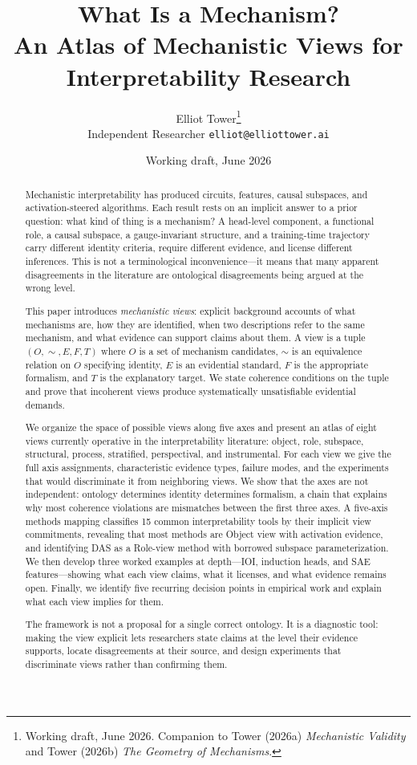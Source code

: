 \documentclass[11pt]{article}
\title{\textbf{What Is a Mechanism?}\\[0.3em]
\large An Atlas of Mechanistic Views for Interpretability Research}
\author{Elliot Tower\thanks{Working draft, June 2026. Companion to
  Tower (2026a) \emph{Mechanistic Validity} and Tower (2026b)
  \emph{The Geometry of Mechanisms}.}\\[0.2em]
\small Independent Researcher \quad \texttt{elliot@elliottower.ai}}
\date{Working draft, June 2026}
\theoremstyle{remark}
\begin{document}
\maketitle

\begin{abstract}
Mechanistic interpretability has produced circuits, features, causal
subspaces, and activation-steered algorithms.  Each result rests on an
implicit answer to a prior question: what kind of thing is a mechanism?
A head-level component, a functional role, a causal subspace, a
gauge-invariant structure, and a training-time trajectory carry
different identity criteria, require different evidence, and license
different inferences.  This is not a terminological inconvenience---it
means that many apparent disagreements in the literature are
ontological disagreements being argued at the wrong level.

This paper introduces \emph{mechanistic views}: explicit background
accounts of what mechanisms are, how they are identified, when two
descriptions refer to the same mechanism, and what evidence can
support claims about them.  A view is a tuple $(O, {\sim}, E, F, T)$
where $O$ is a set of mechanism candidates, ${\sim}$ is an equivalence
relation on $O$ specifying identity, $E$ is an evidential standard, $F$
is the appropriate formalism, and $T$ is the explanatory target.  We
state coherence conditions on the tuple and prove that incoherent views
produce systematically unsatisfiable evidential demands.

We organize the space of possible views along five axes and present an
atlas of eight views currently operative in the interpretability
literature: object, role, subspace, structural, process, stratified,
perspectival, and instrumental.  For each view we give the full axis
assignments, characteristic evidence types, failure modes, and the
experiments that would discriminate it from neighboring views.  We show
that the axes are not independent: ontology determines identity
determines formalism, a chain that explains why most coherence violations
are mismatches between the first three axes.  A five-axis methods mapping
classifies 15 common interpretability tools by their implicit view
commitments, revealing that most methods are Object view with activation
evidence, and identifying DAS as a Role-view method with borrowed
subspace parameterization.  We then develop three worked examples at
depth---IOI, induction heads, and SAE features---showing what each view
claims, what it licenses, and what evidence remains open.  Finally, we
identify five recurring decision points in empirical work and explain
what each view implies for them.

The framework is not a proposal for a single correct ontology.  It is a
diagnostic tool: making the view explicit lets researchers state claims
at the level their evidence supports, locate disagreements at their
source, and design experiments that discriminate views rather than
confirming them.
\end{abstract}
\end{document}
